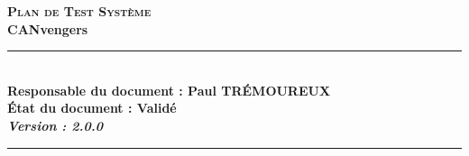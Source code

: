 \documentclass[a4paper,11pt,titlepage,french]{article}
\newcommand{\equipe}{CANvengers}
\newcommand{\rqt}{Paul TRÉMOUREUX}
\newcommand{\versionPdT}{2.0.0}
\begin{document}
\sloppy%
\renewcommand{\arraystretch}{1.5}
\begin{center}%
{\Large {\textsc{\bf Plan de Test Système}}}
\vspace{0.4cm}\\
{\large\bf \equipe}
\vspace{0.4cm}\\
\rule[0.5ex]{0.52\textwidth}{0.1mm} \\
\vspace{0.2cm}
{\large\bf{Responsable du document : {\rqt}}}
\vspace{0.2cm}\\
{\large\bf{État du document : Validé}}
\vspace{0.2cm}\\
{\large\bf\textit{Version : {\versionPdT}}}
\end{center}
\vspace{-0.2cm}
\noindent\rule[0.5ex]{\textwidth}{0.1mm}
\newpage


\newpage
\tableofcontents
\newpage

\newpage


\newpage


\newpage


\newpage


\newpage


\newpage


\newpage


\newpage
\end{document}
